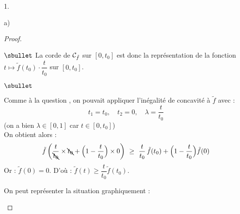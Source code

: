 \begin{noliste}{1.}
\begin{noliste}{a)}
\begin{proof}
\begin{noliste}{$\sbullet$}
      La corde de ${\cal C}_{\tilde{f}}$ sur $[0,t_0]$ est donc la 
      représentation 
      de la 
      fonction $t\mapsto \tilde{f}(t_0)\cdot \dfrac{t}{t_0}$
      sur $[0,t_0]$.
    \end{noliste}
    
    
    
    
    \newpage
    
    
    
    \begin{remark}
     \begin{noliste}{$\sbullet$}
      \item Comme à la question , on pouvait
      appliquer 
      l'inégalité de concavité à $\tilde{f}$ avec :
      \[
        t_1 = t_0, \quad t_2 = 0, \quad \lambda = \dfrac{t}{t_0}
      \]
      (on a bien $\lambda \in [0,1]$ car $t\in [0,t_0]$)\\
      On obtient alors :
	\[
	  \tilde{f}\left(\dfrac{t}{\bcancel{t_0}}\times \bcancel{t_0} + 
	  \Big(1- \dfrac{t}{t_0}\Big) \times 0\right) \ \geq \ 
	  \dfrac{t}{t_0} \, \tilde{f}(t_0) + \Big(1-\dfrac{t}{t_0}\Big) 
	  \tilde{f}(0)
	\]
	Or : $\tilde{f}(0)=0$. 
	D'où :
	$
	  \tilde{f}(t) \geq \dfrac{t}{t_0} \tilde{f}(t_0).
	$
      
      \item On peut représenter la situation graphiquement :
      

\end{noliste}
\end{remark}
\end{proof}
\end{noliste}
\end{noliste}
